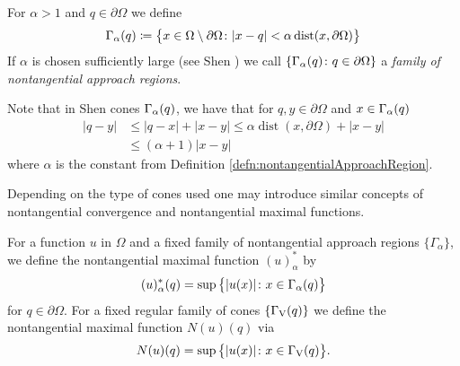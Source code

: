 \begin{defn}
  \label{defn:nontangentialApproachRegion}
   For $\alpha > 1$ and $q \in \partial\Omega$ we define 
   \begin{align*}
     \Gamma_\alpha(q) \coloneqq \big\{ x \in \Omega \setminus \partial\Omega \colon |x - q| < \alpha \operatorname{dist}(x, \partial\Omega) \big\}
   \end{align*}
   If $\alpha$ is chosen sufficiently large (see Shen \cite{Shen2017}) we call $\{ \Gamma_\alpha(q) \colon q \in \partial\Omega\}$ a \emph{family of nontangential approach regions}.
\end{defn}

  Note that in Shen cones $\Gamma_\alpha(q)$, we have that for $q, y \in \partial\Omega$ and $x \in \Gamma_\alpha(q)$
\begin{align}
  \label{eq:shenConeEstimate}
  |q - y| 
  &\leq |q - x| + |x - y| 
  \leq \alpha \operatorname{dist}(x, \partial\Omega) + |x - y|  \nonumber\\
  &\leq (\alpha + 1) |x - y|
\end{align}
where $\alpha$ is the constant from Definition \ref{defn:nontangentialApproachRegion}. 

Depending on the type of cones used one may introduce similar concepts of nontangential convergence and nontangential maximal functions.

\begin{defn}
  For a function $u$ in $\Omega$ and a fixed family of nontangential approach regions $\{\Gamma_\alpha\}$, we define the nontangential maximal function $(u)_\alpha^*$ by
\begin{align}
  \label{eq:defnNontangMaxFunction}
  (u)_\alpha^*(q) = \sup\big\{ |u(x)| \colon x \in \Gamma_\alpha(q)\big\}
\end{align}
for $q \in \partial\Omega$.
  For a fixed regular family of cones $\{\Gamma_\mathrm{V}(q)\}$ we define the nontangential maximal function $N(u)(q)$ via
  \begin{align*}
    N(u)(q) = \sup\big\{ |u(x)| \colon x \in \Gamma_\mathrm{V}(q)\big\}.
  \end{align*}
\end{defn}

